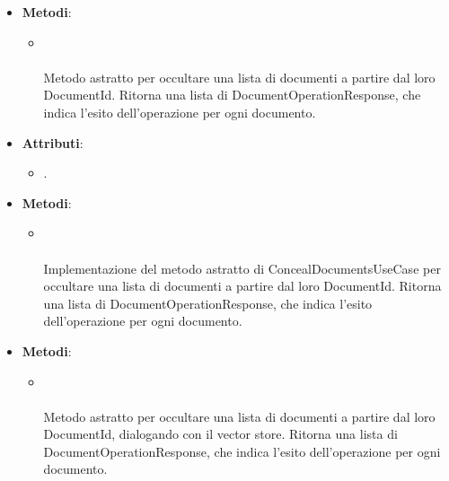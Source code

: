 \documentclass[10pt, a4paper]{article}
\begin{document}
\label{ConcealDocumentsUseCaseDettaglio}
\begin{itemize}
    \item \textbf{Metodi}:
    \begin{itemize}
        \item {}\\ \\
        Metodo astratto per occultare una lista di documenti a partire dal loro DocumentId. Ritorna una lista di DocumentOperationResponse, che indica l'esito dell'operazione per ogni documento.
    \end{itemize}
\end{itemize}

\label{ConcealDocumentsServiceDettaglio}
\begin{itemize}
    \item \textbf{Attributi}:
    \begin{itemize}
        \item {}.  
    \end{itemize}
    \item \textbf{Metodi}:
    \begin{itemize}
        \item {}\\ \\
        Implementazione del metodo astratto di ConcealDocumentsUseCase per occultare una lista di documenti a partire dal loro DocumentId. Ritorna una lista di DocumentOperationResponse, che indica l'esito dell'operazione per ogni documento.
    \end{itemize}
\end{itemize}

\label{ConcealDocumentsPortDettaglio}
\begin{itemize}
    \item \textbf{Metodi}:
    \begin{itemize}
        \item {}\\ \\
        Metodo astratto per occultare una lista di documenti a partire dal loro DocumentId, dialogando con il vector store. Ritorna una lista di DocumentOperationResponse, che indica l'esito dell'operazione per ogni documento.
    \end{itemize}
\end{itemize}
\end{document}
